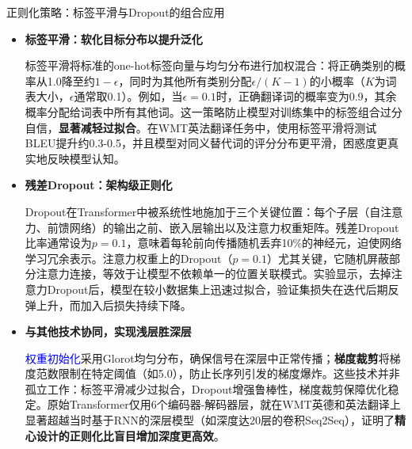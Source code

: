 \documentclass[11pt]{beamer}
\begin{document}
\begin{frame}{正则化策略：标签平滑与Dropout的组合应用}
\begin{itemize}
    \item \textbf{标签平滑：软化目标分布以提升泛化}
    
    标签平滑将标准的one-hot标签向量与均匀分布进行加权混合：将正确类别的概率从1.0降至约$1-\epsilon$，同时为其他所有类别分配$\epsilon/(K-1)$的小概率（$K$为词表大小，$\epsilon$通常取0.1）。例如，当$\epsilon=0.1$时，正确翻译词的概率变为0.9，其余概率分配给词表中所有其他词。这一策略防止模型对训练集中的标签组合过分自信，\textbf{显著减轻过拟合}。在WMT英法翻译任务中，使用标签平滑将测试BLEU提升约0.3-0.5，并且模型对同义替代词的评分分布更平滑，困惑度更真实地反映模型认知。

    \item \textbf{残差Dropout：架构级正则化}
    
    \alert{Dropout}在Transformer中被系统性地施加于三个关键位置：每个子层（自注意力、前馈网络）的输出之前、嵌入层输出以及注意力权重矩阵。残差Dropout比率通常设为$p=0.1$，意味着每轮前向传播随机丢弃10\%的神经元，迫使网络学习冗余表示。注意力权重上的Dropout（$p=0.1$）尤其关键，它随机屏蔽部分注意力连接，等效于让模型不依赖单一的位置关联模式。实验显示，去掉注意力Dropout后，模型在较小数据集上迅速过拟合，验证集损失在迭代后期反弹上升，而加入后损失持续下降。

    \item \textbf{与其他技术协同，实现浅层胜深层}
    
    \textcolor{blue}{权重初始化}采用Glorot均匀分布，确保信号在深层中正常传播；\textbf{梯度裁剪}将梯度范数限制在特定阈值（如5.0），防止长序列引发的梯度爆炸。这些技术并非孤立工作：标签平滑减少过拟合，Dropout增强鲁棒性，梯度裁剪保障优化稳定。原始Transformer仅用6个编码器-解码器层，就在WMT英德和英法翻译上显著超越当时基于RNN的深层模型（如深度达20层的卷积Seq2Seq），证明了\textbf{精心设计的正则化比盲目增加深度更高效}。
\end{itemize}
\end{frame}
\end{document}
